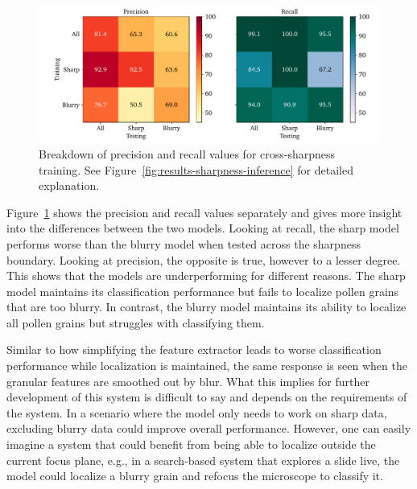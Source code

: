 \begin{figure}[htbp]
  \centering
  \includegraphics[width=\textwidth]{figs/results/sharpness/confustion_balanced_test_dual.pdf}
  \caption[Precision \& Recall across sharpness boundary]{%
Breakdown of precision and recall values for cross-sharpness training. See Figure~\ref{fig:results-sharpness-inference} for detailed explanation.
  }\label{fig:results-sharpness-pr-rec}
\end{figure}

Figure~\ref{fig:results-sharpness-pr-rec} shows the precision and recall values separately and gives more insight into the differences between the two models.
Looking at recall, the sharp model performs worse than the blurry model when tested across the sharpness boundary.
Looking at precision, the opposite is true, however to a lesser degree.
This shows that the models are underperforming for different reasons.
The sharp model maintains its classification performance but fails to localize pollen grains that are too blurry. In contrast, the blurry model maintains its ability to localize all pollen grains but struggles with classifying them.

Similar to how simplifying the feature extractor leads to worse classification performance while localization is maintained, the same response is seen when the granular features are smoothed out by blur.
What this implies for further development of this system is difficult to say and depends on the requirements of the system.
In a scenario where the model only needs to work on sharp data, excluding blurry data could improve overall performance.
However, one can easily imagine a system that could benefit from being able to localize outside the current focus plane, e.g., in a search-based system that explores a slide live, the model could localize a blurry grain and refocus the microscope to classify it.


